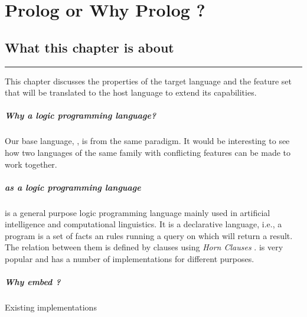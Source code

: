 \documentclass[thesis-solanki.tex]{subfiles}
\begin{document}
\chapter{Prolog or Why Prolog ?}\label{chap:pwp}


\section{What this chapter is about}

\noindent\rule{\textwidth}{0.5pt}

This chapter discusses the properties of the target language  and the feature set that will be translated to the host 
language to extend its capabilities.

\paragraph{Why a logic programming language?}
Our base language, , is from the same paradigm. It would be interesting to see how two languages of the same family with 
conflicting features can be made to work together.

\paragraph{ as a logic programming language}
 is a general purpose logic programming language mainly used in artificial intelligence and
  computational linguistics.
  It is a declarative language, i.e., a program is a set of facts an rules running a
  query on which will return a result.
  The relation between them is defined by clauses using \textit{Horn Clauses} \cite{wikiprolog}.
   is very popular and has a number of implementations
  \cite{website:comparisonofprologimplementationswiki} for different purposes.


\paragraph{Why embed  ?}
Existing implementations
\end{document}
